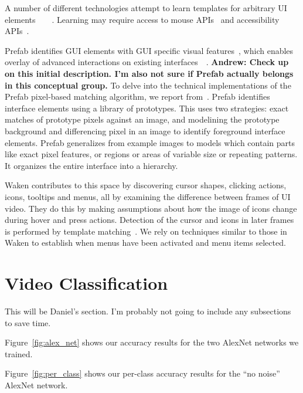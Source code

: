 \documentclass[10pt]{article}
\begin{document}
A number of different technologies attempt to learn templates for arbitrary UI 
elements~\cite{chang_associating_2011}~\cite{dixon_prefab_2010}~\cite{hurst_automatically_2010}~\cite{matejka_ambient_2011}.
Learning may require access to mouse APIs~\cite{hurst_automatically_2010}
and accessibility APIs~\cite{chang_associating_2011}.

Prefab identifies GUI elements with GUI specific visual features~\cite{dixon_prefab_2010}, which 
enables overlay of advanced interactions on existing interfaces~\cite{dixon_content_2011}~\cite{dixon_general-purpose_2012}.
\textbf{Andrew: Check up on this initial description.  I'm also not sure
if Prefab actually belongs in this conceptual group.}
To delve into the technical implementations of the Prefab pixel-based 
matching algorithm, we report from~\cite{dixon_general-purpose_2012}.
Prefab identifies interface elements using a library of prototypes.  
This uses two strategies: exact matches of prototype pixels against an image,
and modelining the prototype background and differencing pixel in an image 
to identify foreground interface elements.  
Prefab generalizes from example images to models which contain parts like 
exact pixel features, or regions or areas of variable size or repeating 
patterns.  It organizes the entire interface into a hierarchy.

Waken contributes to this space by discovering 
cursor shapes, clicking actions, icons, tooltips and menus, all by examining 
the difference between frames of UI video.  They do this by making assumptions 
about how the image of icons change during hover and press actions.  Detection 
of the cursor and icons in later frames is performed by template matching~\cite{banovic_waken_2012}.
We rely on techniques similar to those in Waken to establish when menus
have been activated and menu items selected.


\section{Video Classification}

This will be Daniel's section. I'm probably not going to include any subsections to save time.

Figure~\ref{fig:alex_net} shows our accuracy results for the two AlexNet networks we trained.

Figure~\ref{fig:per_class} shows our per-class accuracy results for the ``no noise'' AlexNet
network.
\end{document}
